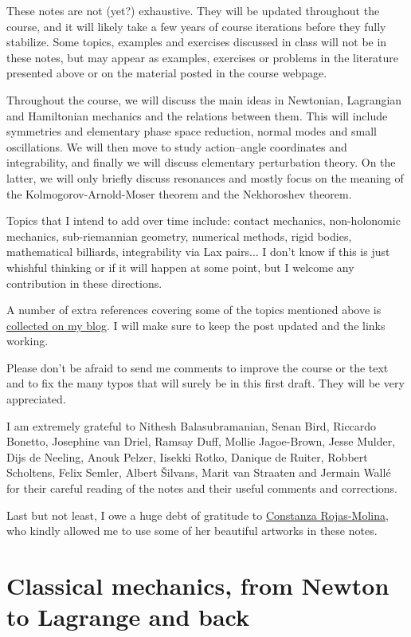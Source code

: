 \documentclass[english,fontsize=11pt,paper=b5]{scrbook}
\theoremstyle{definition}
\begin{document}
  These notes are not (yet?) exhaustive.
  They will be updated throughout the course, and it will likely take a few years of course iterations before they fully stabilize.
  Some topics, examples and exercises discussed in class will not be in these notes, but may appear as examples, exercises or problems in the literature presented above or on the material posted in the course webpage.

  Throughout the course, we will discuss the main ideas in Newtonian, Lagrangian and Hamiltonian mechanics and the relations between them.
  This will include symmetries and elementary phase space reduction, normal modes and small oscillations.
  We will then move to study action--angle coordinates and integrability, and finally we will discuss elementary perturbation theory.
  On the latter, we will only briefly discuss resonances and mostly focus on the meaning of the Kolmogorov-Arnold-Moser theorem and the Nekhoroshev theorem.

  Topics that I intend to add over time include: contact mechanics, non-holonomic mechanics, sub-riemannian geometry, numerical methods, rigid bodies, mathematical billiards, integrability via Lax pairs... I don't know if this is just whishful thinking or if it will happen at some point, but I welcome any contribution in these directions.

  A number of extra references covering some of the topics mentioned above is \href{https://www.mseri.me/links-from-hm/}{collected on my blog}. I will make sure to keep the post updated and the links working. \medskip

  Please don't be afraid to send me comments to improve the course or the text and to fix the many typos that will surely be in this first draft. They will be very appreciated.

  I am extremely grateful to Nithesh Balasubramanian, Senan Bird, Riccardo Bonetto, Jose\-phine van Driel, Ramsay Duff, Mollie Jagoe-Brown, Jesse Mulder, Dijs de Neeling, Anouk Pelzer, Iisekki Rotko, Danique de Ruiter, Robbert Scholtens, Felix Semler, Albert \v{S}ilvans, Marit van Straaten and Jermain Wall\'e for their careful reading of the notes and their useful comments and corrections.

  Last but not least, I owe a huge debt of gratitude to \href{https://crojasmolina.com}{Constanza Rojas-Molina}, who kindly allowed me to use some of her beautiful artworks in these notes.

  \chapter{Classical mechanics, from Newton to Lagrange and back}
\end{document}
